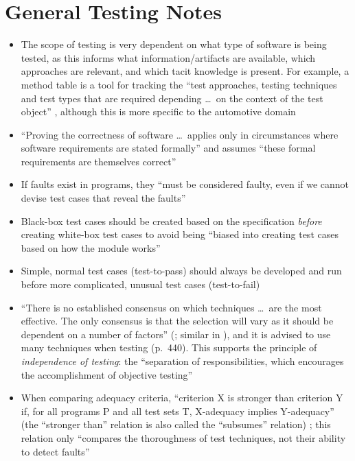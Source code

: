 \section{General Testing Notes}

\begin{itemize}
    \item The scope of testing is very dependent on what type of software
          is being tested, as this informs what information/artifacts are
          available, which approaches are relevant, and which tacit knowledge
          is present. For example, a method table
          is a tool for tracking the ``test approaches, testing techniques
          and test types that are required depending \dots\ on the context of
          the test object'' \citepISTQB{} , although
          this is more specific to the automotive domain
    \item ``Proving the correctness of software \dots\ applies only in
          circumstances where software requirements are stated formally'' and
          assumes ``these formal requirements are themselves correct''
          \citep[p.~398]{vanVliet2000}
    \item If faults exist in programs, they ``must be considered faulty, even
          if we cannot devise test cases that reveal the faults''
          \citep[p.~401]{vanVliet2000}
    \item Black-box test cases should be created based on the specification
          \emph{before} creating white-box test cases to avoid being ``biased
          into creating test cases based on how the module works''
          \citep[p.~113]{Patton2006}
    \item Simple, normal test cases (test-to-pass) should always be developed
          and run before more complicated, unusual test cases (test-to-fail)
          \citep[p.~66]{Patton2006}
    \item ``There is no established consensus on which techniques \dots\ are
          the most effective. The only consensus is that the selection will
          vary as it should be dependent on a number of factors''
          (\citealp[p.~128]{IEEE2021}; similar in
          \citealp[p.~440]{vanVliet2000}), and it is advised to
          use many techniques when testing (p.~440).
          This supports the principle of \emph{independence of testing}: the
          ``separation of responsibilities, which encourages the
          accomplishment of objective testing'' \citepISTQB{}
    \item When comparing adequacy criteria, ``criterion X is stronger than
          criterion Y if, for all programs P and all test sets T, X-adequacy
          implies Y-adequacy'' (the ``stronger than'' relation is also called
          the ``subsumes'' relation) \citep[p.~432]{vanVliet2000};
          this relation only ``compares the thoroughness of test techniques,
          not their ability to detect faults'' \citep[p.~434]{vanVliet2000}
\end{itemize}

